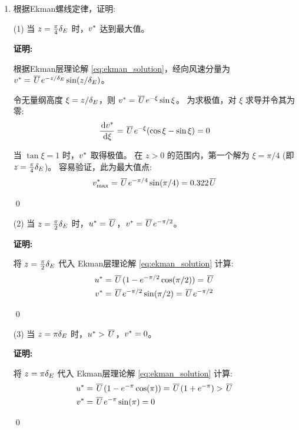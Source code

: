\begin{enumerate}
    \qed

    \item 根据Ekman螺线定律，证明:

    (1) 当 $z = \frac{\pi}{4} \delta_E$ 时，$v^*$ 达到最大值。

    \vspace{1em}
    \textbf{证明:}

    根据Ekman层理论解 \eqref{eq:ekman_solution}，经向风速分量为 $v^* = \mkern2mu \overline{U} \mkern2mu e^{-z/\delta_E} \sin(z/\delta_E)$。

    令无量纲高度 $\xi = z/\delta_E$，则 $v^* = \mkern2mu \overline{U} \mkern2mu e^{-\xi} \sin \xi$。
    为求极值，对 $\xi$ 求导并令其为零:
    \begin{equation*}
        \ode{\flayer{v}}{\xi} = \mean{U} e^{-\xi} (\cos \xi - \sin \xi) = 0
    \end{equation*}

    当 $\tan \xi = 1$ 时，$v^*$ 取得极值。
    在 $z > 0$ 的范围内，第一个解为 $\xi = \pi/4$ (即 $z = \frac{\pi}{4} \delta_E$)。
    容易验证，此为最大值点:
    \begin{equation*}
        v^*_{\max} = \mkern2mu \overline{U} \mkern2mu e^{-\pi/4} \sin(\pi/4) = 0.322 \mkern2mu \overline{U} \mkern2mu
    \end{equation*}

    \qed

    (2) 当 $z = \frac{\pi}{2} \delta_E$ 时，$u^* = \mkern2mu \overline{U} \mkern2mu$，$v^* = \mkern2mu \overline{U} \mkern2mu e^{-\pi/2}$。

    \vspace{1em}
    \textbf{证明:}

    将 $z = \frac{\pi}{2} \delta_E$ 代入 Ekman层理论解 \eqref{eq:ekman_solution} 计算:
    \begin{align*}
        u^* &= \mkern2mu \overline{U} \mkern2mu (1 - e^{-\pi/2} \cos(\pi/2)) = \mkern2mu \overline{U} \mkern2mu \\
        v^* &= \mkern2mu \overline{U} \mkern2mu e^{-\pi/2} \sin(\pi/2) = \mkern2mu \overline{U} \mkern2mu e^{-\pi/2}
    \end{align*}

    \qed

    (3) 当 $z = \pi \delta_E$ 时，$u^* > \mkern2mu \overline{U} \mkern2mu$，$v^* = 0$。

    \vspace{1em}
    \textbf{证明:}

    将 $z = \pi \delta_E$ 代入 Ekman层理论解 \eqref{eq:ekman_solution} 计算:
    \begin{align*}
        u^* &= \mkern2mu \overline{U} \mkern2mu (1 - e^{-\pi} \cos(\pi)) = \mkern2mu \overline{U} \mkern2mu (1 + e^{-\pi}) > \mkern2mu \overline{U} \mkern2mu \\
        v^* &= \mkern2mu \overline{U} \mkern2mu e^{-\pi} \sin(\pi) = 0
    \end{align*}

    \qed

\end{enumerate}

